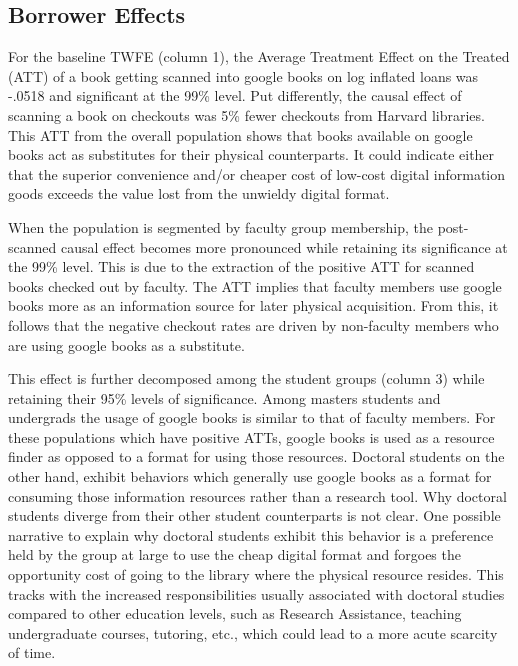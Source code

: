 \documentclass{article}
\begin{document}
\subsection{Borrower Effects}
For the baseline TWFE (column 1), the Average Treatment Effect on the Treated (ATT) of a book getting scanned into google books on log inflated loans was -.0518 and significant at the 99\% level. Put differently, the causal effect of scanning a book on checkouts was 5\% fewer checkouts from Harvard libraries. This ATT from the overall population shows that books available on google books act as substitutes for their physical counterparts. It could indicate either that the superior convenience and/or cheaper cost of low-cost digital information goods exceeds the value lost from the unwieldy digital format. 

When the population is segmented by faculty group membership, the post-scanned causal effect becomes more pronounced while retaining its significance at the 99\% level. This is due to the extraction of the positive ATT for scanned books checked out by faculty. The ATT implies that faculty members use google books more as an information source for later physical acquisition. From this, it follows that the negative checkout rates are driven by non-faculty members who are using google books as a substitute. 

This effect is further decomposed among the student groups (column 3) while retaining their 95\% levels of significance. Among masters students and undergrads the usage of google books is similar to that of faculty members. For these populations which have positive ATTs, google books is used as a resource finder as opposed to a format for using those resources. Doctoral students on the other hand, exhibit behaviors which generally use google books as a format for consuming those information resources rather than a research tool. Why doctoral students diverge from their other student counterparts is not clear. One possible narrative to explain why doctoral students exhibit this behavior is a preference held by the group at large to use the cheap digital format and forgoes the opportunity cost of going to the library where the physical resource resides. This tracks with the increased responsibilities usually associated with doctoral studies compared to other education levels, such as Research Assistance, teaching undergraduate courses, tutoring, etc., which could lead to a more acute scarcity of time.
\end{document}
